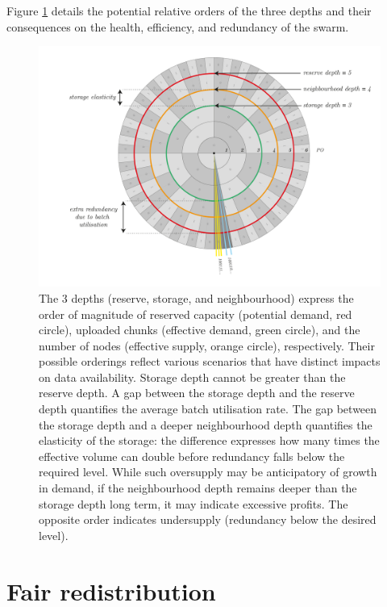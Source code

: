 Figure \ref{fig:depths} details the potential relative orders of the three depths and their consequences on the health, efficiency, and redundancy of the swarm.

\begin{figure}[!ht]
  \centering
    \includegraphics[width=.7\textwidth]{fig/depths-2.pdf}
  \caption[Depths]{The 3 depths (reserve, storage, and neighbourhood) express the order of magnitude of reserved capacity (potential demand, red circle), uploaded chunks (effective demand, green circle), and the number of nodes (effective supply, orange circle), respectively. Their possible orderings reflect various scenarios that have distinct impacts on data availability. Storage depth cannot be greater than the reserve depth. A gap between the storage depth and the reserve depth quantifies the average batch utilisation rate. The gap between the storage depth and a deeper neighbourhood depth quantifies the elasticity of the storage: the difference expresses how many times the effective volume can double before redundancy falls below the required level. While such oversupply may be anticipatory of growth in demand, if the neighbourhood depth remains deeper than the storage depth long term, it may indicate excessive profits. The opposite order indicates undersupply (redundancy below the desired level).}
\label{fig:depths}
\end{figure}    


\section{Fair redistribution}\label{sec:redistribution}


